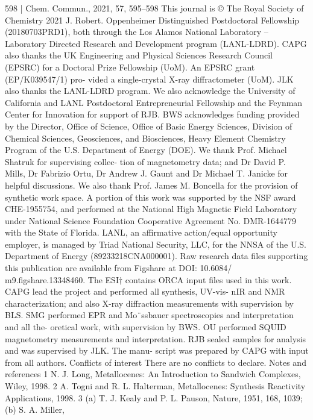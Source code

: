 \documentclass{article}
\begin{document}
\newpage


598 | Chem. Commun., 2021, 57, 595--598
This journal is © The Royal Society of Chemistry 2021
J. Robert. Oppenheimer Distinguished Postdoctoral Fellowship
(20180703PRD1), both through the Los Alamos National
Laboratory – Laboratory Directed Research and Development
program (LANL-LDRD). CAPG also thanks the UK Engineering
and Physical Sciences Research Council (EPSRC) for a Doctoral
Prize Fellowship (UoM). An EPSRC grant (EP/K039547/1) pro-
vided a single-crystal X-ray diffractometer (UoM). JLK also
thanks the LANL-LDRD program. We also acknowledge the
University of California and LANL Postdoctoral Entrepreneurial
Fellowship and the Feynman Center for Innovation for support
of RJB. BWS acknowledges funding provided by the Director,
Office of Science, Office of Basic Energy Sciences, Division
of Chemical Sciences, Geosciences, and Biosciences, Heavy
Element Chemistry Program of the U.S. Department of Energy
(DOE). We thank Prof. Michael Shatruk for supervising collec-
tion of magnetometry data; and Dr David P. Mills, Dr Fabrizio
Ortu, Dr Andrew J. Gaunt and Dr Michael T. Janicke for helpful
discussions. We also thank Prof. James M. Boncella for the
provision of synthetic work space. A portion of this work was
supported by the NSF award CHE-1955754, and performed at
the National High Magnetic Field Laboratory under National
Science Foundation Cooperative Agreement No. DMR-1644779
with the State of Florida. LANL, an affirmative action/equal
opportunity employer, is managed by Triad National Security,
LLC,
for
the
NNSA
of
the
U.S.
Department
of
Energy
(89233218CNA000001). Raw research data files supporting this
publication are available from Figshare at DOI: 10.6084/
m9.figshare.13348460. The ESI† contains ORCA input files
used in this work.
CAPG lead the project and performed all synthesis, UV-vis-
nIR and NMR characterization; and also X-ray diﬀraction
measurements with supervision by BLS. SMG performed EPR
and Mo¨ssbauer spectroscopies and interpretation and all the-
oretical work, with supervision by BWS. OU performed SQUID
magnetometry measurements and interpretation. RJB sealed
samples for analysis and was supervised by JLK. The manu-
script was prepared by CAPG with input from all authors.
Conflicts of interest
There are no conflicts to declare.
Notes and references
1 N. J. Long, Metallocenes: An Introduction to Sandwich Complexes,
Wiley, 1998.
2 A. Togni and R. L. Halterman, Metallocenes: Synthesis Reactivity
Applications, 1998.
3 (a) T. J. Kealy and P. L. Pauson, Nature, 1951, 168, 1039; (b) S. A. Miller,
\end{document}
